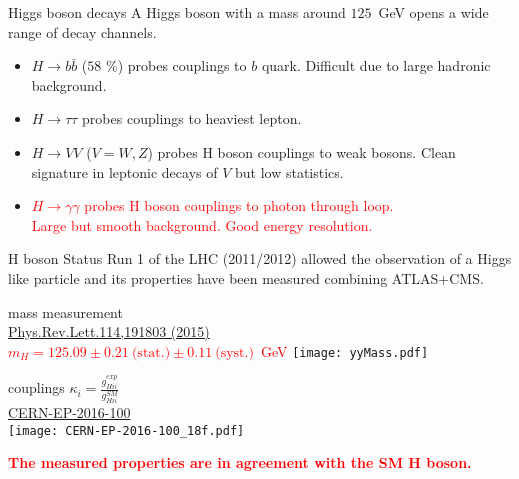 \begin{frame}{Higgs boson decays}
  A Higgs boson with a mass around $125$~GeV opens a wide range of decay channels.
  
  \begin{minipage}{0.49\linewidth}
  \end{minipage}
  \hfill
  \begin{minipage}{0.49\linewidth}
    \begin{itemize}
    \item $H\rightarrow b\bar{b}$ ($58$ \%) probes couplings to $b$ quark.
      Difficult due to large hadronic background.
    \item $H\rightarrow \tau\tau$ probes couplings to heaviest lepton.
    \item $H\rightarrow VV$ ($V=W,Z$) probes H boson couplings to weak bosons.
      Clean signature in leptonic decays of $V$ but low statistics.
    \end{itemize}
  \end{minipage}
  \begin{itemize}
    \item \textcolor{red}{$H\rightarrow\gamma\gamma$ probes H boson couplings to photon through loop.\\
      Large but smooth background. Good energy resolution.}\\

\end{itemize}
\end{frame}
\begin{frame}{H boson Status}
  Run 1 of the LHC (2011/2012) allowed the observation of a Higgs like particle and its properties have been measured combining ATLAS+CMS.
  \vfill
  \begin{minipage}[t]{0.59\linewidth}
    \centering
    mass measurement \\  \href{http://journals.aps.org/prl/pdf/10.1103/PhysRevLett.114. 191803}{Phys.Rev.Lett.114,191803 (2015)}\\
    \textcolor{red}{$m_H = 125.09 \pm 0.21~\text{(stat.)} \pm 0.11~\text{(syst.)} $~GeV}  
    \texttt{[image: yyMass.pdf]}
  \end{minipage}
  \hfill
  \begin{minipage}[t]{0.4\linewidth}
    \centering
    couplings $\kappa_i =\frac{g_{Hii}^{exp}}{g_{Hii}^{SM}}$ \\
    \href{https://cds.cern.ch/record/2158863}{CERN-EP-2016-100} \\
    \vfill
    \texttt{[image: CERN-EP-2016-100\_18f.pdf]} 
  \end{minipage}
\textcolor{red}{\bf The measured properties are in agreement with the SM H boson.}
\end{frame}
